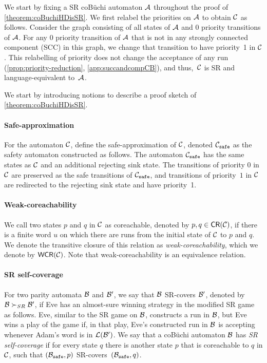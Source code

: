 \theoremcobuchisrtoma*
We start by fixing a SR coB\"uchi automaton $\mathcal{A}$ throughout the proof of \cref{theorem:coBuchiHDisSR}. 
We first relabel the priorities on $\mathcal{A}$ to obtain $\mathcal{C}$ as follows. Consider the graph consisting of all states of $\mathcal{A}$ and 0 priority transitions of $\mathcal{A}$. For any 0 priority transition of $\mathcal{A}$ that is not in any strongly connected component (SCC) in this graph, we change that transition to have priority~1 in $\mathcal{C}$. This relabelling of priority does not change the acceptance of any run (\cref{prop:priority-reduction}, \cref{app:succandcompCB}), and thus,~$\mathcal{C}$ is SR and language-equivalent to~$\mathcal{A}$.  

We start by introducing notions to describe a proof sketch of \cref{theorem:coBuchiHDisSR}. 
\paragraph*{Safe-approximation}
For the automaton $\mathcal{C}$, define the safe-approximation of $\mathcal{C}$, denoted $\mathcal{C}_{\texttt{safe}}$ as the safety automaton constructed as follows. The automaton $\mathcal{C}_{\texttt{safe}}$ has the same states as $\mathcal{C}$ and an additional rejecting sink state. The transitions of priority $0$ in $\mathcal{C}$ are preserved as the safe transitions of $\mathcal{C}_{\texttt{safe}}$, and transitions of priority~$1$ in $\mathcal{C}$ are redirected to the rejecting sink state and have priority~1. 

\paragraph*{Weak-coreachability}
We call two states  $p$ and $q$ in $\mathcal{C}$ as coreachable, denoted by $p,q\in {\mathsf{CR}}(\mathcal{C})$, if there is a finite word $u$ on which there are runs from the initial state of $\mathcal{C}$ to $p$ and $q$. We denote the transitive closure of this relation as \emph{weak-coreachability}, which we denote by $\mathsf{WCR}(\mathcal{C})$. Note that weak-coreachability is an equivalence relation.

\paragraph*{SR self-coverage} 
For two  parity automata $\mathcal{B}$ and $\mathcal{B}'$, we say that $\mathcal{B}$ SR-covers $\mathcal{B}'$, denoted by $\mathcal{B} \succ_{SR} \mathcal{B}'$, if Eve has an almost-sure winning strategy in the modified SR game as follows. Eve, similar to the SR game on $\mathcal{B}$, constructs a run in $\mathcal{B}$, but 
Eve wins a play of the game if, in that play, Eve's constructed run in $\mathcal{B}$ is accepting whenever Adam's word is in $\mathcal{L}(\mathcal{B}')$.
We say that a coB\"uchi automaton $\mathcal{B}$ has \emph{SR self-coverage} if for every state $q$ there is another state $p$ that is coreachable to $q$ in $\mathcal{C}$, such that $(\mathcal{B}_{\texttt{safe}},p)$ SR-covers~$(\mathcal{B}_{\texttt{safe}},q)$.  

